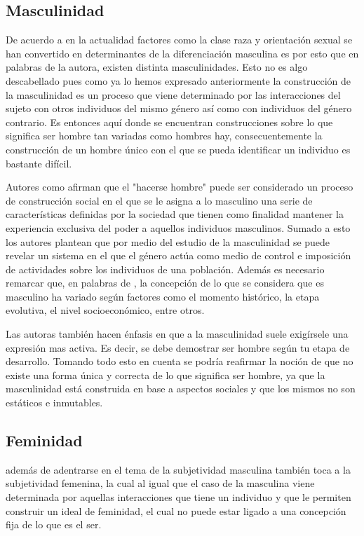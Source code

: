 \subsection{Masculinidad}

De acuerdo a \textcite{Burin2003} en la actualidad factores como la clase
raza y orientación sexual se han convertido en determinantes de la
diferenciación masculina es por esto que en palabras de la autora, existen
distinta masculinidades. Esto no es algo descabellado pues como ya lo hemos
expresado anteriormente la construcción de la masculinidad es un proceso que
viene determinado por las interacciones del sujeto con otros individuos del
mismo género así como con individuos del género contrario. Es entonces aquí
donde se encuentran construcciones sobre lo que significa ser hombre tan
variadas como hombres hay, consecuentemente la construcción de un hombre único
con el que se pueda identificar un individuo es bastante difícil.

Autores como \textcite{Tellez2011} afirman que el "hacerse hombre" puede ser
considerado un proceso de construcción social en el que se le asigna a lo
masculino una serie de características definidas por la sociedad que tienen como
finalidad mantener la experiencia exclusiva del poder a aquellos individuos
masculinos. Sumado a esto los autores plantean que por medio del estudio de la
masculinidad se puede revelar un sistema en el que el género actúa como medio de
control e imposición de actividades sobre los individuos de una población.
Además es necesario remarcar que, en palabras de \textcite{Tellez2011}, la
concepción de lo que se considera que es masculino ha variado según factores
como el momento histórico, la etapa evolutiva, el nivel socioeconómico, entre
otros.

Las autoras también hacen énfasis en que a la masculinidad suele exigírsele una
expresión mas activa. Es decir, se debe demostrar ser hombre según tu etapa de
desarrollo. Tomando todo esto en cuenta se podría reafirmar la noción de que no
existe una forma única y correcta de lo que significa ser hombre, ya que la
masculinidad está construida en base a aspectos sociales y que los mismos no son
estáticos e inmutables.

\subsection{Feminidad}

\textcite{Burin2003} además de adentrarse en el tema de la subjetividad
masculina también toca a la subjetividad femenina, la cual al igual que el caso
de la masculina viene determinada por aquellas interacciones que tiene un
individuo y que le permiten construir un ideal de feminidad, el cual no puede
estar ligado a una concepción fija de lo que es el ser.

